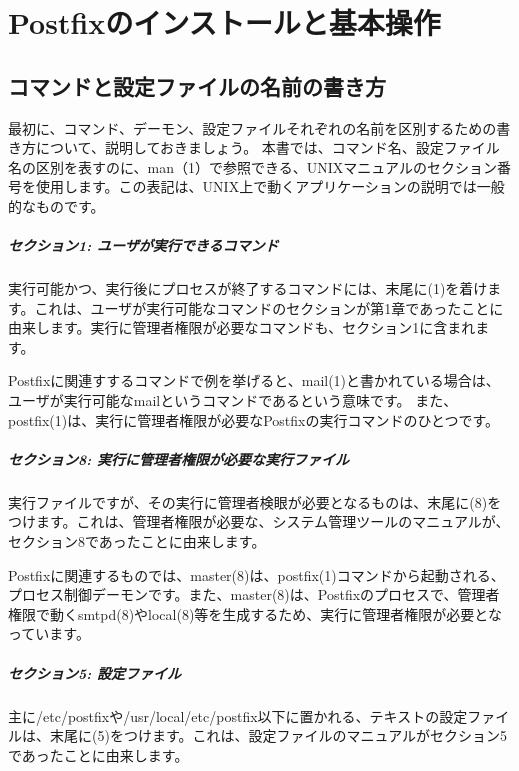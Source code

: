 \chapter{Postfixのインストールと基本操作}

\section{コマンドと設定ファイルの名前の書き方}
最初に、コマンド、デーモン、設定ファイルそれぞれの名前を区別するための書き方について、説明しておきましょう。
本書では、コマンド名、設定ファイル名の区別を表すのに、man（1）で参照できる、UNIXマニュアルのセクション番号を使用します。この表記は、UNIX上で動くアプリケーションの説明では一般的なものです。

\paragraph{セクション1: ユーザが実行できるコマンド}
実行可能かつ、実行後にプロセスが終了するコマンドには、末尾に(1)を着けます。これは、ユーザが実行可能なコマンドのセクションが第1章であったことに由来します。実行に管理者権限が必要なコマンドも、セクション1に含まれます。

Postfixに関連すするコマンドで例を挙げると、mail(1)と書かれている場合は、ユーザが実行可能なmailというコマンドであるという意味です。
また、postfix(1)は、実行に管理者権限が必要なPostfixの実行コマンドのひとつです。

\paragraph{セクション8: 実行に管理者権限が必要な実行ファイル}
実行ファイルですが、その実行に管理者検眼が必要となるものは、末尾に(8)をつけます。これは、管理者権限が必要な、システム管理ツールのマニュアルが、セクション8であったことに由来します。

Postfixに関連するものでは、master(8)は、postfix(1)コマンドから起動される、プロセス制御デーモンです。また、master(8)は、Postfixのプロセスで、管理者権限で動くsmtpd(8)やlocal(8)等を生成するため、実行に管理者権限が必要となっています。

\paragraph{セクション5: 設定ファイル}
主に/etc/postfixや/usr/local/etc/postfix以下に置かれる、テキストの設定ファイルは、末尾に(5)をつけます。これは、設定ファイルのマニュアルがセクション5であったことに由来します。

